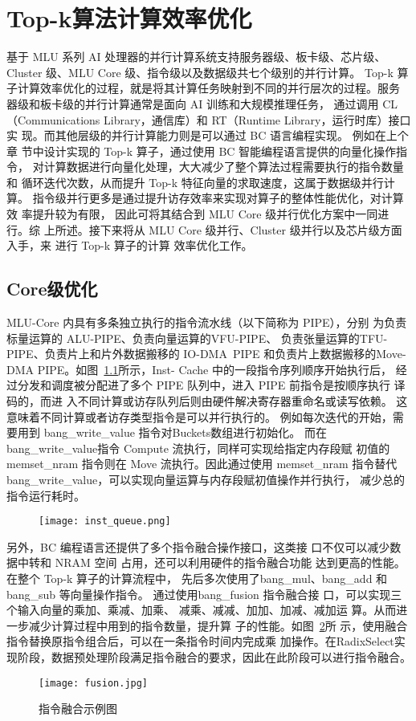\section{Top-k算法计算效率优化}
基于 MLU 系列 AI 处理器的并行计算系统支持服务器级、板卡级、芯片级、Cluster 级、MLU Core 级、指令级以及数据级共七个级别的并行计算。
Top-k 算 子计算效率优化的过程，就是将其计算任务映射到不同的并行层次的过程。服务 器级和板卡级的并行计算通常是面向 AI 训练和大规模推理任务，
通过调用 CL（Communications Library，通信库）和 RT（Runtime Library，运行时库）接口实 现。而其他层级的并行计算能力则是可以通过 BC 语言编程实现。
例如在上个章 节中设计实现的 Top-k 算子，通过使用 BC 智能编程语言提供的向量化操作指令， 对计算数据进行向量化处理，大大减少了整个算法过程需要执行的指令数量和
 循环迭代次数，从而提升 Top-k 特征向量的求取速度，这属于数据级并行计算。 指令级并行更多是通过提升访存效率来实现对算子的整体性能优化，对计算效 率提升较为有限，
 因此可将其结合到 MLU Core 级并行优化方案中一同进行。综 上所述。接下来将从 MLU Core 级并行、Cluster 级并行以及芯片级方面入手，来 进行 Top-k 算子的计算
 效率优化工作。

\subsection{Core级优化}
MLU-Core 内具有多条独立执行的指令流水线（以下简称为 PIPE），分别 为负责标量运算的 ALU-PIPE、负责向量运算的VFU-PIPE、
负责张量运算的TFU-PIPE、负责片上和片外数据搬移的 IO-DMA\ PIPE 和负责片上数据搬移的Move-DMA PIPE。如图~\ref{}所示，Inst-
Cache 中的一段指令序列顺序开始执行后， 经过分发和调度被分配进了多个 PIPE 队列中，进入 PIPE 前指令是按顺序执行 译码的，而进
入不同计算或访存队列后则由硬件解决寄存器重命名或读写依赖。 这意味着不同计算或者访存类型指令是可以并行执行的。
例如每次迭代的开始，需要用到 bang\_write\_value 指令对Buckets数组进行初始化。
而在bang\_write\_value指令 Compute 流执行，同样可实现给指定内存段赋 初值的
 memset\_nram 指令则在 Move 流执行。因此通过使用 memset\_nram 指令替代
 bang\_write\_value，可以实现向量运算与内存段赋初值操作并行执行，
 减少总的指令运行耗时。
\begin{figure}[ht]
    \centering
    \texttt{[image: inst\_queue.png]}
    \caption{}
    \label{fig:inst_queue}
\end{figure}

另外，BC 编程语言还提供了多个指令融合操作接口，这类接 口不仅可以减少数据中转和 NRAM 空间
占用，还可以利用硬件的指令融合功能 达到更高的性能。在整个 Top-k 算子的计算流程中，
先后多次使用了bang\_mul、bang\_add 和 bang\_sub 等向量操作指令。
通过使用bang\_fusion 指令融合接 口，可以实现三个输入向量的乘加、乘减、加乘、
减乘、减减、加加、加减、减加运 算。从而进一步减少计算过程中用到的指令数量，提升算
子的性能。如图~\ref{fig:fusion}所 示，使用融合指令替换原指令组合后，可以在一条指令时间内完成乘
加操作。在RadixSelect实现阶段，数据预处理阶段满足指令融合的要求，因此在此阶段可以进行指令融合。
\begin{figure}[ht]
    \centering
    \texttt{[image: fusion.jpg]}
    \caption{指令融合示例图}
    \label{fig:fusion}
\end{figure}

